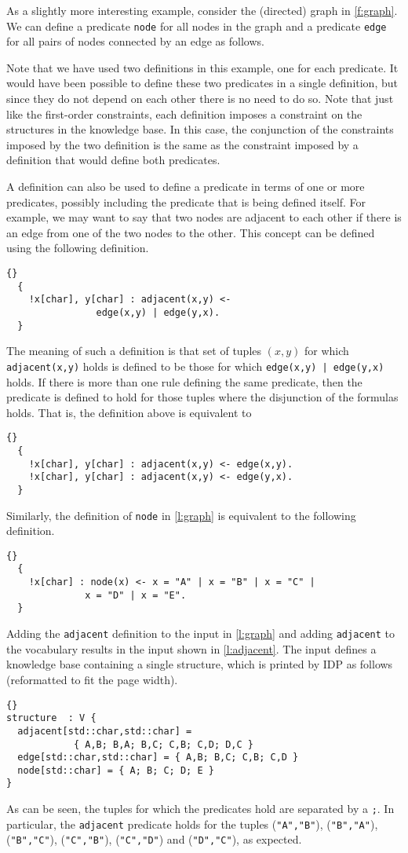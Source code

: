 \documentclass{article}
\newcommand{\idp}{{\sc IDP}\xspace}
\begin{document}
As a slightly more interesting example, consider the (directed)
graph in \autoref{f:graph}.  We can define a predicate \texttt{node}
for all nodes in the graph and a predicate \texttt{edge} for all
pairs of nodes connected by an edge as follows.

Note that we have used two definitions in this example, one for
each predicate.  It would have been possible to define these two
predicates in a single definition, but since they do not depend
on each other there is no need to do so.
Note that just like the first-order constraints, each definition
imposes a constraint on the structures in the knowledge base.
In this case, the conjunction of the constraints imposed by
the two definition is the same as the constraint imposed by
a definition that would define both predicates.

A definition can also be used to define a predicate in terms
of one or more predicates, possibly including the predicate that
is being defined itself.
For example, we may want to say that two nodes are adjacent
to each other if there is an edge from one of the two nodes
to the other.  This concept can be defined using the following
definition.
\begin{lstlisting}{}
  {
    !x[char], y[char] : adjacent(x,y) <-
				edge(x,y) | edge(y,x).
  }
\end{lstlisting}
The meaning of such a definition is that set of tuples $(x,y)$
for which \texttt{adjacent(x,y)} holds is defined to be those
for which \texttt{edge(x,y) | edge(y,x)} holds.
If there is more than one rule defining the same predicate,
then the predicate is defined to hold for those tuples where
the disjunction of the formulas holds.
That is, the definition above is equivalent to
\begin{lstlisting}{}
  {
    !x[char], y[char] : adjacent(x,y) <- edge(x,y).
    !x[char], y[char] : adjacent(x,y) <- edge(y,x).
  }
\end{lstlisting}
Similarly, the definition of \texttt{node} in \autoref{l:graph}
is equivalent to the following definition.
\begin{lstlisting}{}
  {
    !x[char] : node(x) <- x = "A" | x = "B" | x = "C" |
			  x = "D" | x = "E".
  }
\end{lstlisting}

Adding the \texttt{adjacent} definition to the input in \autoref{l:graph} and
adding \texttt{adjacent}
to the vocabulary results in the input shown in \autoref{l:adjacent}.
The input defines a knowledge base containing a single structure,
which is printed by \idp
as follows (reformatted to fit the page width).
\begin{lstlisting}{}
structure  : V {
  adjacent[std::char,std::char] =
		    { A,B; B,A; B,C; C,B; C,D; D,C }
  edge[std::char,std::char] = { A,B; B,C; C,B; C,D }
  node[std::char] = { A; B; C; D; E }
}

\end{lstlisting}
As can be seen, the tuples for which the predicates hold are separated
by a \lstinline{;}.  In particular, the \texttt{adjacent} predicate
holds for the tuples
(\texttt{"A","B"}),
(\texttt{"B","A"}),
(\texttt{"B","C"}),
(\texttt{"C","B"}),
(\texttt{"C","D"}) and
(\texttt{"D","C"}),
as expected.
\end{document}
